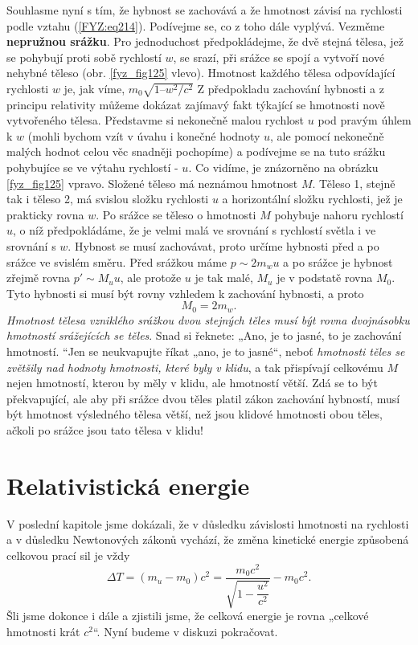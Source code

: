 {{    Souhlasme nyní s tím, že hybnost se zachovává a že hmotnost závisí na rychlosti podle vztahu 
    (\ref{FYZ:eq214}). Podívejme se, co z toho dále vyplývá. Vezměme \textbf{nepružnou srážku}. Pro 
    jednoduchost předpokládejme, že dvě stejná tělesa, jež se pohybují proti sobě rychlostí \(w\), 
    se srazí, při srážce se spojí a vytvoří nové nehybné těleso (obr. \ref{fyz_fig125} vlevo). 
    Hmotnost každého tělesa odpovídající rychlosti \(w\) je, jak víme, \(m_0\sqrt{1 – w^2/c^2}\) Z 
    předpokladu zachování hybnosti a z principu relativity můžeme dokázat zajímavý fakt týkající se 
    hmotnosti nově vytvořeného tělesa. Představme si nekonečně malou rychlost \(u\) pod pravým 
    úhlem k \(w\) (mohli bychom vzít v úvahu i konečné hodnoty \(u\), ale pomocí nekonečně malých 
    hodnot celou věc snadněji pochopíme) a podívejme se na tuto srážku pohybujíce se ve výtahu 
    rychlostí - \(u\). Co vidíme, je znázorněno na obrázku \ref{fyz_fig125} vpravo. Složené těleso 
    má neznámou hmotnost \(M\). Těleso 1, stejně tak i těleso 2, má svislou složku rychlosti \(u\) 
    a horizontální složku rychlosti, jež je prakticky rovna \(w\). Po srážce se těleso o 
    hmotnosti \(M\) pohybuje nahoru rychlostí \(u\), o níž předpokládáme, že je velmi malá ve 
    srovnání s rychlostí světla i ve srovnání s \(w\). Hybnost se musí zachovávat, proto určíme 
    hybnosti před a po srážce ve svislém směru. Před srážkou máme \(p \sim 2m_wu\) a po srážce je 
    hybnost zřejmě rovna \(p' \sim M_uu\), ale protože \(u\) je tak malé, \(M_u\) je v podstatě 
    rovna \(M_0\). Tyto hybnosti si musí být rovny vzhledem k zachování hybnosti, a proto
    \begin{equation}\label{FYZ:eq216}
      M_0 = 2m_w.
    \end{equation}
    \emph{Hmotnost tělesa vzniklého srážkou dvou stejných těles musí být rovna dvojnásobku 
    hmotností srážejících se těles}. Snad si řeknete: „Ano, je to jasné, to je zachování hmotností. 
    “Jen se neukvapujte říkat „ano, je to jasné“, neboť \emph{hmotnosti těles se zvětšily nad 
    hodnoty hmotnosti, které byly v klidu}, a tak přispívají celkovému \(M\) nejen hmotností, 
    kterou by měly v klidu, ale hmotností větší. Zdá se to být překvapující, ale aby při srážce 
    dvou těles platil zákon zachování hybností, musí být hmotnost výsledného tělesa větší, než jsou 
    klidové hmotnosti obou těles, ačkoli po srážce jsou tato tělesa v klidu!
    
  \section{Relativistická energie}\label{fyz:IchapXVIsecV}
    V poslední kapitole jsme dokázali, že v důsledku závislosti hmotnosti na rychlosti a v důsledku 
    Newtonových zákonů vychází, že změna kinetické energie způsobená celkovou prací sil je vždy
    \begin{equation}\label{FYZ:eq217}
      \Delta T = (m_u - m_0)c^2 = \frac{m_0c^2}{\sqrt{1 - \dfrac{u^2}{c^2}}} - m_0c^2.
    \end{equation}
    Šli jsme dokonce i dále a zjistili jsme, že celková energie je rovna „celkové hmotnosti krát 
    \(c^2\)“. Nyní budeme v diskuzi pokračovat.
    
}}
